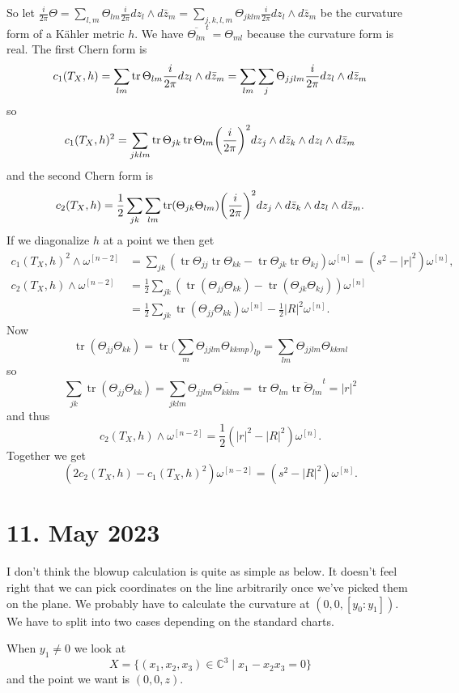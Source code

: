 \documentclass[11pt]{article}
\theoremstyle{definition}
\newcommand{\kk}[1]{\mathbb{#1}}
\def\^#1{^{[#1]}}
\def\ov#1{\overline{#1}}
\DeclareMathOperator{\tr}{tr}
\begin{document}
So let
$\frac{i}{2\pi} \Theta
= \sum_{l,m} \Theta_{lm} \frac{i}{2\pi} dz_l \wedge d\bar z_m
= \sum_{j,k,l,m} \Theta_{jklm} \frac{i}{2\pi} dz_l \wedge d\bar z_m$
be the curvature form of a K\"ahler metric $h$.
We have $\ov{\Theta_{lm}}^t = \Theta_{ml}$ because the curvature form is real.
The first Chern form is
$$
c_1(T_X,h)
= \sum_{lm} \tr\Theta_{lm} \fip dz_l \wedge d\bar z_m
= \sum_{lm} \sum_{j} \Theta_{jjlm} \fip dz_l \wedge d\bar z_m
$$
so
$$
c_1(T_X,h)^2
= \sum_{jklm} \tr\Theta_{jk} \tr \Theta_{lm}
\biggl(\fip\biggr)^2
dz_j \wedge d\bar z_k \wedge d z_l \wedge d \bar z_m
$$
and the second Chern form is
$$
c_2(T_X,h)
=
\frac12 \sum_{jk} \sum_{lm}
\tr(\Theta_{jk} \Theta_{lm})
\biggl(\fip\biggr)^2
dz_j \wedge d\bar z_k \wedge d z_l \wedge d \bar z_m.
$$
If we diagonalize $h$ at a point we then get
\begin{align*}
c_1(T_X,h)^2 \wedge \omega\^{n-2}
&= \sum_{jk} (\tr \Theta_{jj} \tr \Theta_{kk} - \tr \Theta_{jk} \tr \Theta_{kj})
\omega\^n
= (s^2 - |r|^2) \omega\^n,
\\
c_2(T_X,h) \wedge \omega\^{n-2}
&= \frac12 \sum_{jk} (\tr(\Theta_{jj} \Theta_{kk}) - \tr(\Theta_{jk}\Theta_{kj}))
\omega\^n
\\
&= \frac12 \sum_{jk} \tr(\Theta_{jj} \Theta_{kk}) \omega\^n - \frac12 |R|^2 \omega\^n.
\end{align*}
Now
$$
\tr(\Theta_{jj} \Theta_{kk})
= \tr\biggl(\sum_{m}\Theta_{jjlm} \Theta_{kkmp}\biggr)_{lp}
= \sum_{lm} \Theta_{jjlm} \Theta_{kkml}
$$
so
$$
\sum_{jk} \tr(\Theta_{jj} \Theta_{kk})
= \sum_{jklm} \Theta_{jjlm} \ov{\Theta_{kklm}}
= \tr \Theta_{lm} \ov{\tr \Theta_{lm}}^t
= |r|^2
$$
and thus
$$
c_2(T_X,h) \wedge \omega\^{n-2}
= \frac12 (|r|^2 - |R|^2)\omega\^n.
$$
Together we get
$$
(2c_2(T_X,h) - c_1(T_X,h)^2) \omega\^{n-2}
= (s^2 - |R|^2) \omega\^n.
$$



\section{11. May 2023}

I don't think the blowup calculation is quite as simple as below.
It doesn't feel right that we can pick coordinates on the line
arbitrarily once we've picked them on the plane.
We probably have to calculate the curvature at $(0,0,[y_0:y_1])$.
We have to split into two cases depending on the standard charts.

When $y_1 \not=0$ we look at
$$
X = \{(x_1,x_2,x_3) \in \kk C^3 \mid x_1 - x_2x_3 = 0 \}
$$
and the point we want is $(0,0,z)$.
\end{document}
